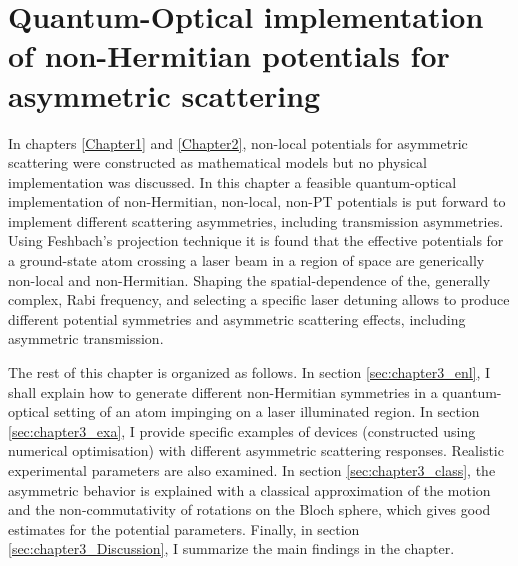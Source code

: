 
\chapter{Quantum-Optical implementation of non-Hermitian potentials for asymmetric scattering}
\label{Chapter3}

In chapters \ref{Chapter1} and \ref{Chapter2}, non-local potentials for asymmetric scattering were constructed as mathematical models but no physical implementation was discussed. In this chapter a feasible quantum-optical implementation
of non-Hermitian, non-local, non-PT potentials is put forward to implement different scattering asymmetries, including transmission
asymmetries. Using Feshbach's projection technique it is found that the effective potentials for a ground-state atom crossing a laser beam in a region of space are generically non-local and non-Hermitian. Shaping the spatial-dependence of the, generally complex, Rabi frequency, and selecting a specific laser detuning allows to produce different potential symmetries and asymmetric scattering effects, including asymmetric transmission.

The rest of this chapter is organized as follows. In section \ref{sec:chapter3_enl}, I shall explain how to generate different non-Hermitian symmetries in a quantum-optical setting of an atom impinging on a laser illuminated region. In section \ref{sec:chapter3_exa}, I provide specific examples of devices (constructed using numerical optimisation) with different asymmetric scattering responses. Realistic experimental parameters are also examined. In section \ref{sec:chapter3_class}, the asymmetric behavior is explained with a classical approximation of the motion and the non-commutativity of rotations on the Bloch sphere, which gives good estimates for the potential parameters. Finally, in section \ref{sec:chapter3_Discussion}, I summarize the main findings in the chapter.

